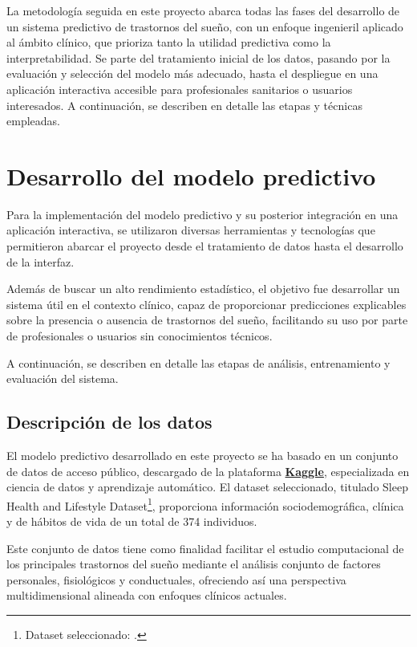\label{cap:metodologia}


La metodología seguida en este proyecto abarca todas las fases del desarrollo de un sistema predictivo de trastornos del sueño, con un enfoque ingenieril aplicado al ámbito clínico, que prioriza tanto la utilidad predictiva como la interpretabilidad. Se parte del tratamiento inicial de los datos, pasando por la evaluación y selección del modelo más adecuado, hasta el despliegue en una aplicación interactiva accesible para profesionales sanitarios o usuarios interesados. A continuación, se describen en detalle las etapas y técnicas empleadas.

\section{Desarrollo del modelo predictivo}

Para la implementación del modelo predictivo y su posterior integración en una aplicación interactiva, se utilizaron diversas herramientas y tecnologías que permitieron abarcar el proyecto desde el tratamiento de datos hasta el desarrollo de la interfaz.

Además de buscar un alto rendimiento estadístico, el objetivo fue desarrollar un sistema útil en el contexto clínico, capaz de proporcionar predicciones explicables sobre la presencia o ausencia de trastornos del sueño, facilitando su uso por parte de profesionales o usuarios sin conocimientos técnicos.

A continuación, se describen en detalle las etapas de análisis, entrenamiento y evaluación del sistema.


\subsection{Descripción de los datos}
El modelo predictivo desarrollado en este proyecto se ha basado en un conjunto de datos de acceso público, descargado de la plataforma \textbf{\href{https://www.kaggle.com/}{Kaggle}},  especializada en ciencia de datos y aprendizaje automático. El dataset seleccionado, titulado Sleep Health and Lifestyle Dataset\footnote{Dataset seleccionado: \cite{alnour2024kaggle}.}, proporciona información sociodemográfica, clínica y de hábitos de vida de un total de 374 individuos.

Este conjunto de datos tiene como finalidad facilitar el estudio computacional de los principales trastornos del sueño mediante el análisis conjunto de factores personales, fisiológicos y conductuales, ofreciendo así una perspectiva multidimensional alineada con enfoques clínicos actuales.

